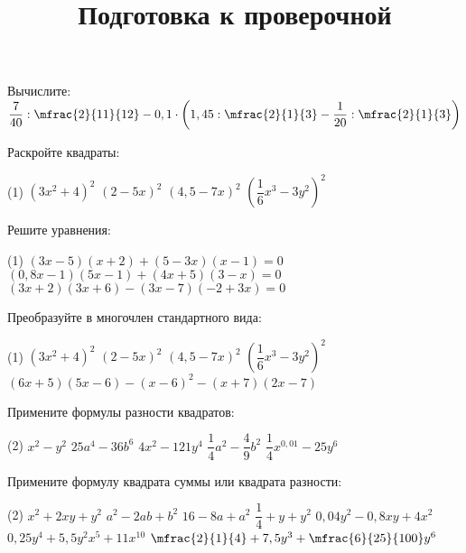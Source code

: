 \begin{class}[number=7]
	\title{Подготовка к проверочной}
	\begin{listofex}
		\item Вычислите: \( \dfrac{7}{40} : \mfrac{2}{11}{12} - 0,1 \cdot \left( 1,45 : \mfrac{2}{1}{3} - \dfrac{1}{20} : \mfrac{2}{1}{3} \right) \)
		\item Раскройте квадраты:
		\begin{tasks}(1)
			\task \( (3x^2+4)^2\)
			\task \( (2-5x)^2 \)
			\task \( (4,5-7x)^2 \)
			\task \( \left(\dfrac{1}{6}x^3-3y^2\right)^2 \)
		\end{tasks}
		
		\item Решите уравнения:
		\begin{tasks}(1)
			\task \( (3x-5)(x+2)+(5-3x)(x-1)=0 \)
			\task \( (0,8x-1)(5x-1)+(4x+5)(3-x)=0 \)
			\task \( (3x+2)(3x+6)-(3x-7)(-2+3x)=0 \)
		\end{tasks}
		\item Преобразуйте в многочлен стандартного вида: 
		\begin{tasks}(1)
			\task \( (3x^2+4)^2\)
			\task \( (2-5x)^2 \)
			\task \( (4,5-7x)^2 \)
			\task \( (\dfrac{1}{6}x^3-3y^2)^2 \)
			\task \( (6x+5)(5x-6)-(x-6)^2-(x+7)(2x-7) \)
		\end{tasks}
		\item Примените формулы разности квадратов:
		\begin{tasks}(2)
			\task \( x^2-y^2 \)
			\task \( 25a^4-36b^6 \)
			\task \( 4x^2-121y^4 \)
			\task \( \dfrac{1}{4}a^2-\dfrac{4}{9}b^2 \)
			\task \( \dfrac{1}{4}x^{0,01}-25y^6 \)
		\end{tasks}
		\item Примените формулу квадрата суммы или квадрата разности:
		\begin{tasks}(2)
			\task \( x^2+2xy+y^2 \)
			\task \( a^2-2ab+b^2 \)
			\task \( 16-8a+a^2 \)
			\task \( \dfrac{1}{4} + y + y^2 \)
			\task \( 0,04y^2-0,8xy+4x^2 \)
			\task \( 0,25y^4+5,5y^2x^5+11x^{10} \)
			\task \( \mfrac{2}{1}{4}+7,5y^3+\mfrac{6}{25}{100}y^6 \)
		\end{tasks}
	\end{listofex}
\end{class}

